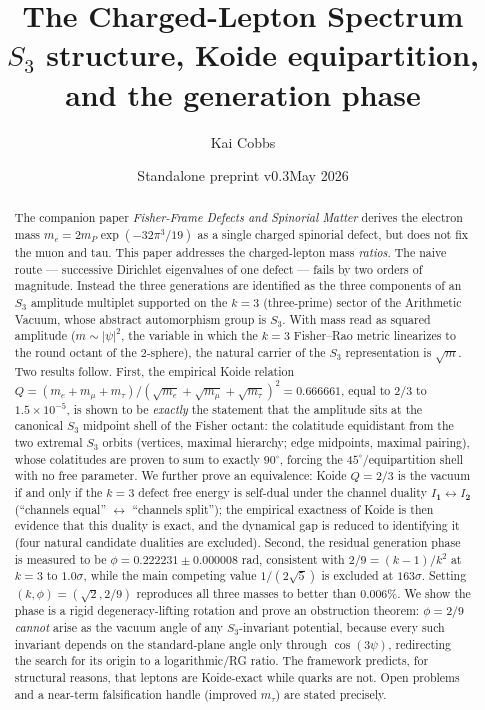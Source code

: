 \documentclass[12pt]{article}
\title{The Charged-Lepton Spectrum\\[6pt]
\large $S_3$ structure, Koide equipartition, and the generation phase}
\author{Kai Cobbs}
\date{Standalone preprint v0.3\quad May 2026}
\theoremstyle{definition}
\theoremstyle{remark}
\begin{document}
\maketitle

\begin{abstract}
The companion paper \emph{Fisher-Frame Defects and Spinorial Matter} derives
the electron mass $m_e=2m_P\exp(-32\pi^3/19)$ as a single charged spinorial
defect, but does not fix the muon and tau. This paper addresses the
charged-lepton mass \emph{ratios}. The naive route --- successive Dirichlet
eigenvalues of one defect --- fails by two orders of magnitude. Instead the
three generations are identified as the three components of an $S_3$ amplitude
multiplet supported on the $k=3$ (three-prime) sector of the Arithmetic
Vacuum, whose abstract automorphism group is $S_3$. With mass read as squared
amplitude ($m\sim|\psi|^2$, the variable in which the $k=3$ Fisher--Rao metric
linearizes to the round octant of the $2$-sphere), the natural carrier of the
$S_3$ representation is
$\sqrt m$. Two results follow. First, the empirical Koide relation
$Q=(m_e+m_\mu+m_\tau)/(\sqrt{m_e}+\sqrt{m_\mu}+\sqrt{m_\tau})^2 = 0.666661$,
equal to $2/3$ to $1.5\times10^{-5}$, is shown to be \emph{exactly} the
statement that the amplitude sits at the canonical $S_3$ midpoint shell of the
Fisher octant: the colatitude equidistant from the two extremal $S_3$ orbits
(vertices, maximal hierarchy; edge midpoints, maximal pairing), whose
colatitudes are proven to sum to exactly $90^\circ$, forcing the
$45^\circ$/equipartition shell with no free parameter. We further prove an
equivalence: Koide $Q=2/3$ is the vacuum if and only if the $k=3$ defect free
energy is self-dual under the channel duality $I_{\mathbf 1}\leftrightarrow
I_{\mathbf 2}$ (``channels equal'' $\leftrightarrow$ ``channels split''); the
empirical exactness of Koide is then evidence that this duality is exact, and
the dynamical gap is reduced to identifying it (four natural candidate dualities
are excluded). Second, the residual
generation phase is measured to be $\phi=0.222231\pm0.000008$ rad, consistent
with $2/9=(k-1)/k^2$ at $k=3$ to $1.0\sigma$, while the main competing value
$1/(2\sqrt5)$ is excluded at $163\sigma$. Setting $(k,\phi)=(\sqrt2,2/9)$
reproduces all three masses to better than $0.006\%$. We show the phase is a
rigid degeneracy-lifting rotation and prove an obstruction theorem: $\phi=2/9$
\emph{cannot} arise as the vacuum angle of any $S_3$-invariant potential,
because every such invariant depends on the standard-plane angle only through
$\cos(3\psi)$, redirecting the search for its origin to a logarithmic/RG
ratio. The framework predicts, for structural reasons, that leptons are
Koide-exact while quarks are not. Open problems and a near-term falsification
handle (improved $m_\tau$) are stated precisely.
\end{abstract}
\end{document}
